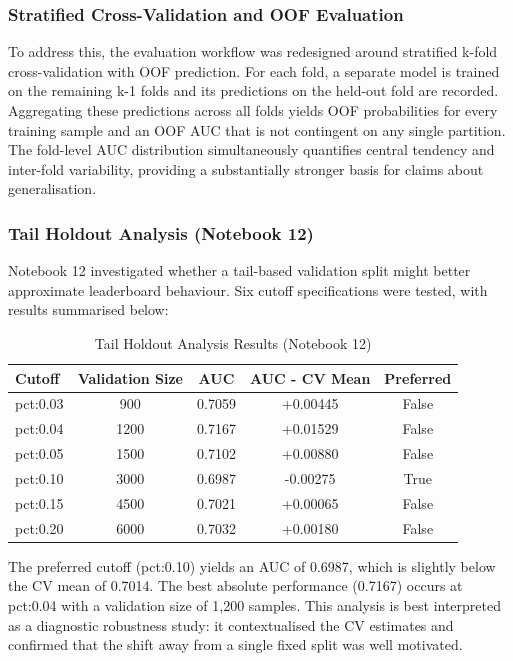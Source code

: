 \documentclass[a4paper,11pt]{article}
\begin{document}
\subsubsection{Stratified Cross-Validation and OOF Evaluation}
To address this, the evaluation workflow was redesigned around stratified k-fold cross-validation with OOF prediction. For each fold, a separate model is trained on the remaining k-1 folds and its predictions on the held-out fold are recorded. Aggregating these predictions across all folds yields OOF probabilities for every training sample and an OOF AUC that is not contingent on any single partition. The fold-level AUC distribution simultaneously quantifies central tendency and inter-fold variability, providing a substantially stronger basis for claims about generalisation.

\subsubsection{Tail Holdout Analysis (Notebook 12)}
Notebook 12 investigated whether a tail-based validation split might better approximate leaderboard behaviour. Six cutoff specifications were tested, with results summarised below:

\begin{table}[H]
\centering
\caption{Tail Holdout Analysis Results (Notebook 12)}
\label{tab:tail_results}
\begin{tabular}{lcccc}
\toprule
\textbf{Cutoff} & \textbf{Validation Size} & \textbf{AUC} & \textbf{AUC - CV Mean} & \textbf{Preferred} \\
\midrule
pct:0.03 & 900 & 0.7059 & +0.00445 & False \\
pct:0.04 & 1200 & 0.7167 & +0.01529 & False \\
pct:0.05 & 1500 & 0.7102 & +0.00880 & False \\
pct:0.10 & 3000 & 0.6987 & -0.00275 & True \\
pct:0.15 & 4500 & 0.7021 & +0.00065 & False \\
pct:0.20 & 6000 & 0.7032 & +0.00180 & False \\
\bottomrule
\end{tabular}
\end{table}

The preferred cutoff (pct:0.10) yields an AUC of 0.6987, which is slightly below the CV mean of 0.7014. The best absolute performance (0.7167) occurs at pct:0.04 with a validation size of 1,200 samples. This analysis is best interpreted as a diagnostic robustness study: it contextualised the CV estimates and confirmed that the shift away from a single fixed split was well motivated.
\end{document}
